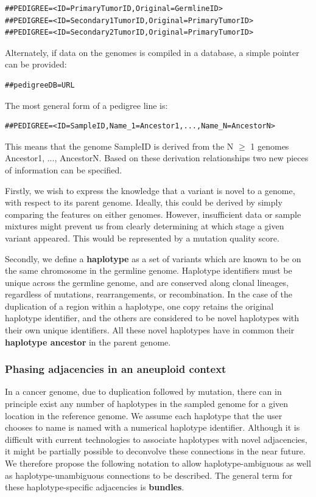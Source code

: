 \documentclass[8pt]{article}
\begin{document}
\begin{verbatim}
##PEDIGREE=<ID=PrimaryTumorID,Original=GermlineID>
##PEDIGREE=<ID=Secondary1TumorID,Original=PrimaryTumorID>
##PEDIGREE=<ID=Secondary2TumorID,Original=PrimaryTumorID>
\end{verbatim}

Alternately, if data on the genomes is compiled in a database, a simple pointer can be provided:

\begin{verbatim}
##pedigreeDB=URL
\end{verbatim}

\begin{samepage}
The most general form of a pedigree line is:

\begin{verbatim}
##PEDIGREE=<ID=SampleID,Name_1=Ancestor1,...,Name_N=AncestorN>
\end{verbatim}
\end{samepage}

This means that the genome SampleID is derived from the N $\ge$ 1 genomes Ancestor1, ..., AncestorN.
Based on these derivation relationships two new pieces of information can be specified.

Firstly, we wish to express the knowledge that a variant is novel to a genome, with respect to its parent genome.
Ideally, this could be derived by simply comparing the features on either genomes.
However, insufficient data or sample mixtures might prevent us from clearly determining at which stage a given variant appeared. This would be represented by a mutation quality score.

Secondly, we define a \textbf{haplotype} as a set of variants which are known to be on the same chromosome in the germline genome.
Haplotype identifiers must be unique across the germline genome, and are conserved along clonal lineages, regardless of mutations, rearrangements, or recombination.
In the case of the duplication of a region within a haplotype, one copy retains the original haplotype identifier, and the others are considered to be novel haplotypes with their own unique identifiers.
All these novel haplotypes have in common their \textbf{haplotype ancestor} in the parent genome.

\subsubsection{Phasing adjacencies in an aneuploid context}
In a cancer genome, due to duplication followed by mutation, there can in principle exist any number of haplotypes in the sampled genome for a given location in the reference genome.
We assume each haplotype that the user chooses to name is named with a numerical haplotype identifier.
Although it is difficult with current technologies to associate haplotypes with novel adjacencies, it might be partially possible to deconvolve these connections in the near future.
We therefore propose the following notation to allow haplotype-ambiguous as well as haplotype-unambiguous connections to be described.
The general term for these haplotype-specific adjacencies is \textbf{bundles}.
\end{document}
